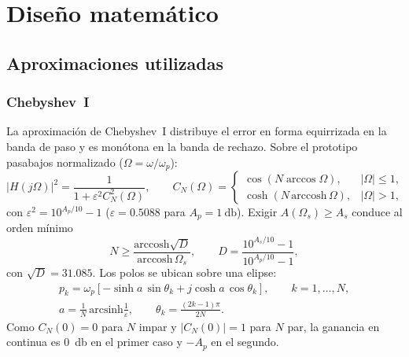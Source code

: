 \section{Diseño matemático}
\label{sec:diseno}

\subsection{Aproximaciones utilizadas}

\subsubsection{Chebyshev~I}
La aproximación de Chebyshev~I distribuye el error en forma equirrizada en la banda de paso y es monótona en la banda de rechazo.
Sobre el prototipo pasabajos normalizado ($\Omega = \omega/\omega_p$):
\begin{equation}
  \lvert H(j\Omega)\rvert^2 = \frac{1}{1+\varepsilon^2 C_N^2(\Omega)}, \qquad
  C_N(\Omega) =
  \begin{cases}
    \cos\!\left(N\arccos\Omega\right), & \lvert\Omega\rvert \le 1,\\
    \cosh\!\left(N\,\mathrm{arccosh}\,\Omega\right), & \lvert\Omega\rvert > 1,
  \end{cases}
  \label{eq:cheby}
\end{equation}
con $\varepsilon^2 = 10^{A_p/10}-1$ ($\varepsilon = \num{0.5088}$ para $A_p = \qty{1}{\decibel}$). Exigir $A(\Omega_s) \ge A_s$ conduce al orden mínimo
\begin{equation}
  N \ge \frac{\mathrm{arccosh}\sqrt{D}}{\mathrm{arccosh}\,\Omega_s}, \qquad D = \frac{10^{A_s/10}-1}{10^{A_p/10}-1},
  \label{eq:orden_cheby}
\end{equation}
con $\sqrt{D} = \num{31.085}$. Los polos se ubican sobre una elipse:
\begin{equation}
  \begin{gathered}
  p_k = \omega_p\left[-\sinh a\,\sin\theta_k + j\cosh a\,\cos\theta_k\right],\qquad k = 1,\dots,N,\\
  a = \frac{1}{N}\,\mathrm{arcsinh}\frac{1}{\varepsilon},\qquad \theta_k = \frac{(2k-1)\pi}{2N}.
  \end{gathered}
  \label{eq:polos_cheby}
\end{equation}
Como $C_N(0) = 0$ para $N$ impar y $\lvert C_N(0)\rvert = 1$ para $N$ par, la ganancia en continua es \qty{0}{\decibel} en el primer caso y $-A_p$ en el segundo.


